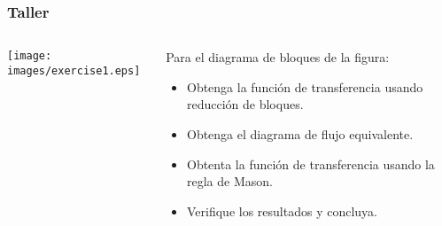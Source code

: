 \documentclass[aspectratio=169,handout]{beamer}
\theoremstyle{definition}
\theoremstyle{plain}
\theoremstyle{remark}
\begin{document}
\begin{frame}[<+->]\frametitle{Taller}
\begin{columns}
\begin{column}{0.5\textwidth}
\centering
\vspace*{5mm} \texttt{[image: images/exercise1.eps]}
\end{column}
\begin{column}{0.5\textwidth}
Para el diagrama de bloques de la figura:\\
\begin{itemize}
	\item Obtenga la función de transferencia usando reducción de bloques.
	\item Obtenga el diagrama de flujo equivalente.
	\item Obtenta la función de transferencia usando la regla de Mason.
	\item Verifique los resultados y concluya.
\end{itemize}
\end{column}
\end{columns}
\end{frame}
\end{document}
